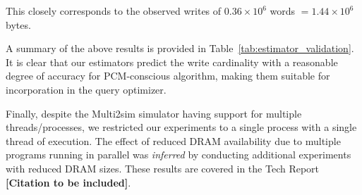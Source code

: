 This closely corresponds to the observed writes of $0.36 \times 10^6$ words $= 1.44 \times 10^6$ bytes.

A summary of the above results is provided in
Table~\ref{tab:estimator_validation}. It is clear that our estimators
predict the write cardinality with a reasonable degree of accuracy for PCM-conscious algorithm, making them suitable for
incorporation in the query optimizer.

Finally, despite the Multi2sim simulator having support for multiple
threads/processes, we restricted our experiments to a single process with
a single thread of execution. The effect of reduced DRAM
availability due to multiple programs running in parallel was \emph{inferred}
by conducting additional experiments with reduced DRAM sizes. These results are covered in the Tech Report \textbf{[Citation to be included]}.


\begin{comment}


Note that it is possible to achieve this lifetime only when the writes
are perfectly levelled across the entire PCM. In practice, however,
there is a degree of skewness in the writes of most algorithms. Due to
this skew, an algorithm might cut short the PCM lifetime considerably
despite doing well on the overall writes, since a particular set of
locations are written to repeatedly. Hence, characterizing the write
skew is fundamental to determining PCM durability.

As mentioned earlier, we track writes at the block level (256B) in our
modified simulator.  In Figure~\ref{fig:wear_dist}, we show the 
write frequencies of the top 100 blocks for the different operators.

As we can see, in the case of hash join, our PCM-conscious algorithms have
almost the same uniform distribution as the native algorithms. though the
initial part of the writes are slightly higher. This is in those cases
when the bitmap used for maintaining the slot occupancy information for
pages in the hash table is evicted intermediately between bit updates,
thereby incurring higher number of writes for that line.

For group-by (using sort), the per block writes due to modified algorithms
are consistently lower than the native algorithms by about $39\%$. The
reason for this is that sorting incurs multiple writes for the same
block when all the input tuples cannot fit in DRAM, which the aspect of
partitioning saves in the PCM-conscious algorithms.

\begin{figure}[htbp]
	\psfig{figure=wear_dist.png, width = 9cm}\centering
	\caption{Operators Wear Distribution }
	\label{fig:wear_dist}
\end{figure} 
\end{comment}




